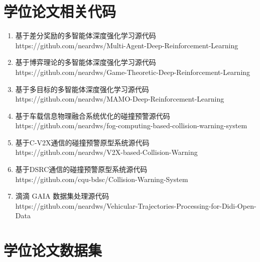 \section[\hspace{-2pt}学位论文相关代码]{{\heiti{} \hspace{-8pt}学位论文相关代码}}
\begin{enumerate}
	\item 基于差分奖励的多智能体深度强化学习源代码\\https://github.com/neardws/Multi-Agent-Deep-Reinforcement-Learning
	\item 基于博弈理论的多智能体深度强化学习源代码\\https://github.com/neardws/Game-Theoretic-Deep-Reinforcement-Learning
	\item 基于多目标的多智能体深度强化学习源代码\\https://github.com/neardws/MAMO-Deep-Reinforcement-Learning
	\item 基于车载信息物理融合系统优化的碰撞预警源代码\\https://github.com/neardws/fog-computing-based-collision-warning-system
	\item 基于C-V2X通信的碰撞预警原型系统源代码\\https://github.com/neardws/V2X-based-Collision-Warning
	\item 基于DSRC通信的碰撞预警原型系统源代码\\https://github.com/cqu-bdsc/Collision-Warning-System
	\item 滴滴 GAIA 数据集处理源代码\\https://github.com/neardws/Vehicular-Trajectories-Processing-for-Didi-Open-Data
\end{enumerate}

\newpage
\section[\hspace{-2pt}学位论文数据集]{{\heiti{} \hspace{-8pt}学位论文数据集}}

